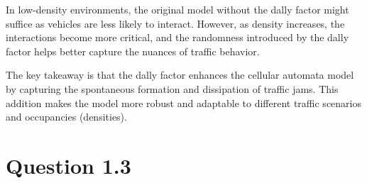 \documentclass{article}
\begin{document}
\begin{enumerate}
    In low-density environments, the original model without the dally factor might suffice as vehicles are less likely to interact. However, as density increases, the interactions become more critical, and the randomness introduced by the dally factor helps better capture the nuances of traffic behavior.

    The key takeaway is that the dally factor enhances the cellular automata model by capturing the spontaneous formation and dissipation of traffic jams. This addition makes the model more robust and adaptable to different traffic scenarios and occupancies (densities). 
    
    
\end{enumerate}

\newpage
\section{Question 1.3}
\end{document}
